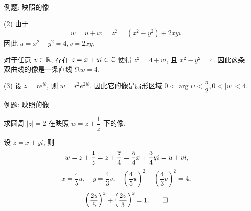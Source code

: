 \begin{frame}{例题: 映照的像}
\begin{solutione}
(2) 由于
\[w=u+iv=z^2=(x^2-y^2)+2xyi.\]
\onslide<+->
因此 $u=x^2-y^2=4,v=2xy$.

\onslide<+->
\indent
对于任意 $v\in{\mathbb{R}}$, 存在 $z=x+yi\in{\mathbb{C}}$ 使得 $z^2=4+vi$, 且 $x^2-y^2=4$.
\onslide<+->
因此这条双曲线的像是一条直线 $\Re w=4$.

(3) 设 $z=re^{i\theta}$, 则 $w=r^2e^{2i\theta}$.
\onslide<+->
因此它的像是扇形区域 $0<\arg w<\dfrac\pi2,0<|w|<4$.
\vspace{-5pt}
\end{solutione}
\end{frame}


\begin{frame}{例题: 映照的像}
\beqskip{7pt}
\begin{example}
求圆周 $|z|=2$ 在映照 $w=z+\dfrac1z$ 下的像.
\end{example}
\begin{solution}
设 $z=x+yi$, 则
\[w=z+\frac1z=z+\frac{\overline z}4=\frac54x+\frac34yi=u+vi,\]
\onslide<+->
\[x=\frac45u,\quad y=\frac43v,\quad \left(\frac45u\right)^2+\left(\frac43v\right)^2=4,\]
\onslide<+->
\[\left(\frac{2u}5\right)^2+\left(\frac{2v}3\right)^2=1.\qedhere\]
\end{solution}
\endgroup
\end{frame}


